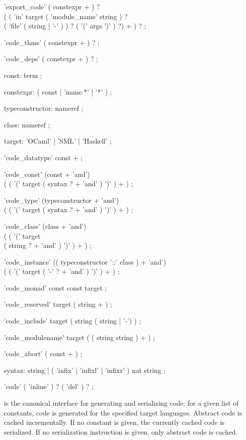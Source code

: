 \begin{isabellebody}
\begin{isamarkuptext}
  \begin{rail}
    'export\_code' ( constexpr + ) ? \\
      ( ( 'in' target ( 'module\_name' string ) ? \\
        ( 'file' ( string | '-' ) ) ? ( '(' args ')' ) ?) + ) ?
    ;

    'code\_thms' ( constexpr + ) ?
    ;

    'code\_deps' ( constexpr + ) ?
    ;

    const: term
    ;

    constexpr: ( const | 'name.*' | '*' )
    ;

    typeconstructor: nameref
    ;

    class: nameref
    ;

    target: 'OCaml' | 'SML' | 'Haskell'
    ;

    'code\_datatype' const +
    ;

    'code\_const' (const + 'and') \\
      ( ( '(' target ( syntax ? + 'and' ) ')' ) + )
    ;

    'code\_type' (typeconstructor + 'and') \\
      ( ( '(' target ( syntax ? + 'and' ) ')' ) + )
    ;

    'code\_class' (class + 'and') \\
      ( ( '(' target \\ ( string ? + 'and' ) ')' ) + )
    ;

    'code\_instance' (( typeconstructor '::' class ) + 'and') \\
      ( ( '(' target ( '-' ? + 'and' ) ')' ) + )
    ;

    'code\_monad' const const target
    ;

    'code\_reserved' target ( string + )
    ;

    'code\_include' target ( string ( string | '-') )
    ;

    'code\_modulename' target ( ( string string ) + )
    ;

    'code\_abort' ( const + )
    ;

    syntax: string | ( 'infix' | 'infixl' | 'infixr' ) nat string
    ;

    'code' ( 'inline' ) ? ( 'del' ) ?
    ;
  \end{rail}

  \begin{description}

  \item \hyperlink{command.HOL.export-code}{\mbox{}} is the canonical interface for
  generating and serializing code: for a given list of constants, code
  is generated for the specified target languages.  Abstract code is
  cached incrementally.  If no constant is given, the currently cached
  code is serialized.  If no serialization instruction is given, only
  abstract code is cached.


\end{description}
\end{isamarkuptext}
\end{isabellebody}
